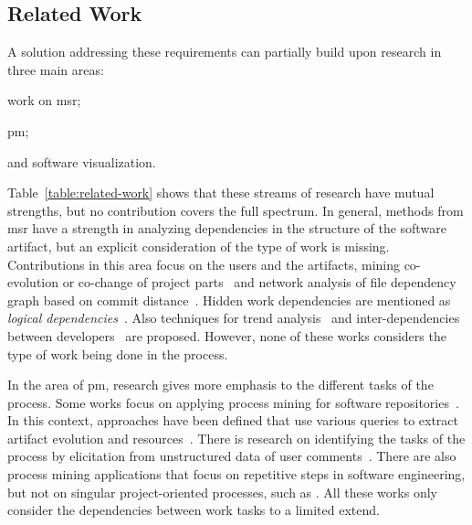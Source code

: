 \subsection{Related Work}
\label{subsec:related}
A solution addressing these requirements can partially build upon research in three main areas:
\begin{inparaenum}[\itshape i)]
	\item work on \gls{msr};
	\item \gls{pm};
	\item and software visualization.
\end{inparaenum}



Table~\ref{table:related-work} shows that these streams of research have mutual strengths, but no contribution covers the full spectrum. In general, methods from \gls{msr} have a strength in analyzing dependencies in the structure of the software artifact, but an explicit consideration of the type of work is missing. Contributions in this area focus on the users and the artifacts, mining co-evolution or co-change of project parts~\cite{zaidman2008mining,DAmbros2009} and network analysis of file dependency graph based on commit distance~\cite{Zimmermann2008,Abate2009,Weicheng2013}. Hidden work dependencies are mentioned as \emph{logical dependencies}~\cite{Oliva2011}. Also techniques for trend analysis~\cite{ruohonen2015time} and inter-dependencies between developers~\cite{lindberg2016coordinating} are proposed. However, none of these works considers the type of work being done in the process.

In the area of \gls{pm}, research gives more emphasis to the different tasks of the process. Some works focus on applying process mining for software repositories~\cite{Poncin2011,Mittal2014,Bala2015}. In this context, approaches have been defined that use various queries to extract artifact evolution and resources~\cite{Beheshti2016,Beheshti2013}. There is research on identifying the tasks of the process by elicitation from unstructured data of user comments~\cite{Goncalves2011}. There are also process mining applications that focus on repetitive steps in software engineering, but not on singular project-oriented processes, such as \cite{Kindler2006}. All these works only consider the dependencies between work tasks to a limited extend.



